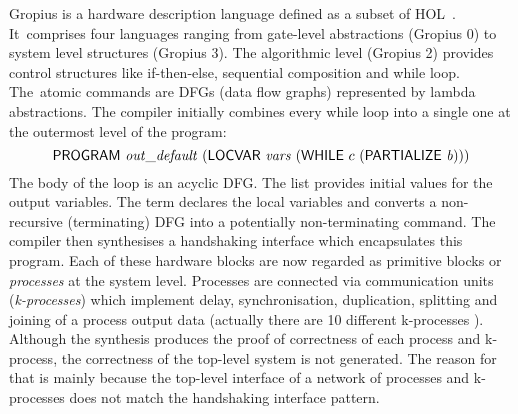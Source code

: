 Gropius is a hardware description language
defined as a subset of HOL~\mbox{\cite{Blu01,Gropius1,BS99,Gropius2}}.
It~comprises four languages ranging
from gate-level abstractions (Gropius 0) to 
system level structures (Gropius 3).
The algorithmic level (Gropius 2)
provides control structures like if-then-else,
sequential composition and while loop.
The~atomic commands are DFGs (data flow
graphs) represented by lambda abstractions.
The compiler initially combines every while loop into
a single one at the outermost level of the
program:
\[
\DEF{PROGRAM}\ \VAR{out\_default}\ (\DEF{LOCVAR}\ \VAR{vars}\ 
(\DEF{WHILE}\ c\ (\DEF{PARTIALIZE}\ \VAR{b})))
\]
The body  of the  loop is an acyclic %
DFG. The list \VAR{out\_default}
provides initial values for the output variables.
The term  declares the local variables
 and  converts a
non-recursive (terminating) DFG into a potentially
non-terminating command.
The compiler then synthesises a handshaking
interface which encapsulates this program.
Each of these hardware blocks are now regarded
as primitive blocks or {\em processes\/} at the system level.
Processes are connected via communication
units ({\em k-processes\/}) which implement delay,
synchronisation, duplication,
splitting and joining of a process output data
(actually there  are 10 different k-processes \cite{Blu01}).
Although the synthesis produces the proof of
correctness of each process and k-process,
the correctness of the top-level system is not generated.
The reason for that is mainly because
the top-level interface of a network of processes and 
k-processes does not match the handshaking interface pattern.
